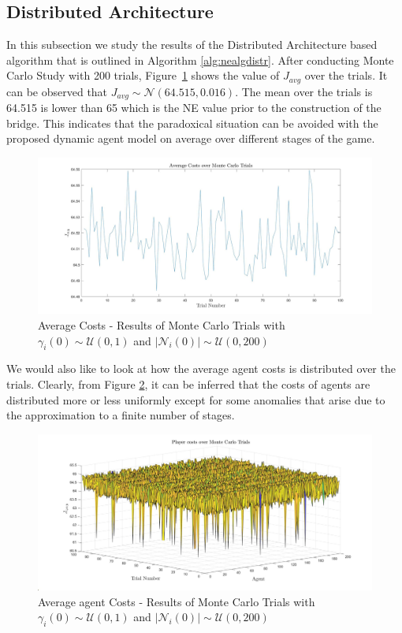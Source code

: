 \documentclass[11pt, letterpaper]{article}
\begin{document}
\subsection{Distributed Architecture}
In this subsection we study the results of the Distributed Architecture based algorithm that is outlined in Algorithm \ref{alg:nealgdistr}. After conducting Monte Carlo Study with 200 trials, Figure~\ref{fig:results_distributed_avg_cost} shows the value of $J_{avg}$ over the trials. It can be observed that $J_{avg} \sim \mathcal{N}(64.515, 0.016)$. The mean over the trials is 64.515 is lower than 65 which is the NE value prior to the construction of the bridge. This indicates that the paradoxical situation can be avoided with the proposed dynamic agent model on average over different stages of the game. 
\begin{figure}[htbp]
    \centering
    \includegraphics[width=\linewidth]{images/results_distributed_avg_cost.jpg}
    \caption{Average Costs - Results of Monte Carlo Trials with $\gamma_i(0) \sim \mathcal{U}(0,1)$ and $|\mathcal{N}_i(0)| \sim \mathcal{U}(0,200)$}
    \label{fig:results_distributed_avg_cost}
\end{figure}
We would also like to look at how the average agent costs is distributed over the trials. Clearly, from Figure \ref{fig:results_distributed_avg_player_cost}, it can be inferred that the costs of agents are distributed more or less uniformly except for some anomalies that arise due to the approximation to a finite number of stages.
\begin{figure}[htbp]
    \centering
    \includegraphics[width=\linewidth]{images/results_distributed_avg_player_cost.jpg}
    \caption{Average agent Costs - Results of Monte Carlo Trials with $\gamma_i(0) \sim \mathcal{U}(0,1)$ and $|\mathcal{N}_i(0)| \sim \mathcal{U}(0,200)$}
    \label{fig:results_distributed_avg_player_cost}
\end{figure}
\end{document}
